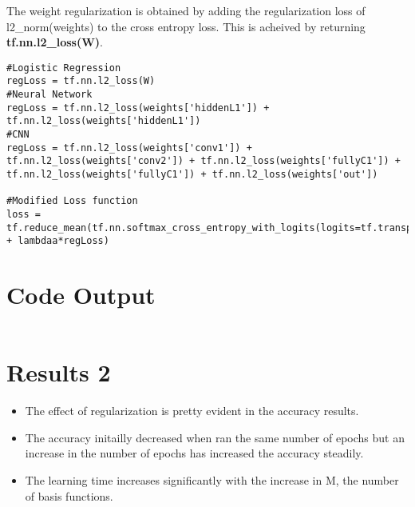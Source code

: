 \documentclass[a4paper,11pt]{article}
\begin{document}
The weight regularization is obtained by adding the regularization loss of l2\_norm(weights) to the cross entropy loss. This is acheived by returning \textbf{tf.nn.l2\_loss(W)}.

\begin{lstlisting}[label={list:fourth}]
#Logistic Regression
regLoss = tf.nn.l2_loss(W)
#Neural Network
regLoss = tf.nn.l2_loss(weights['hiddenL1']) + tf.nn.l2_loss(weights['hiddenL1'])
#CNN
regLoss = tf.nn.l2_loss(weights['conv1']) + tf.nn.l2_loss(weights['conv2']) + tf.nn.l2_loss(weights['fullyC1']) + tf.nn.l2_loss(weights['fullyC1']) + tf.nn.l2_loss(weights['out'])

#Modified Loss function
loss = tf.reduce_mean(tf.nn.softmax_cross_entropy_with_logits(logits=tf.transpose(y),labels=tf.transpose(t)) + lambdaa*regLoss)
\end{lstlisting}

\section*{Code Output}

\begin{lstlisting}[label={list:fifth},caption=Code output.]

\end{lstlisting}

\section*{Results 2}


\begin{itemize}
 \item The effect of regularization is pretty evident in the accuracy results.
 \item The accuracy initailly decreased when ran the same number of epochs but an increase in the number of epochs has increased the accuracy steadily.
 
\item The learning time increases significantly with the increase in $\mathrm{M}$, the number of basis functions. 
\end{itemize}
\end{document}
